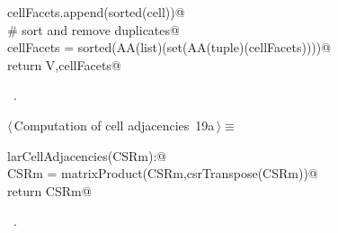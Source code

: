 \documentclass[11pt,oneside]{article}    %
\begin{document}
\begin{flushleft}
\begin{list}{}{}
\mbox{}\verb@                cellFacets.append(sorted(cell))@\\
\mbox{}\verb@    # sort and remove duplicates@\\
\mbox{}\verb@    cellFacets = sorted(AA(list)(set(AA(tuple)(cellFacets))))@\\
\mbox{}\verb@    return V,cellFacets@\\
\mbox{}\verb@@{\NWsep}
\end{list}
\vspace{-1ex}
\footnotesize\addtolength{\baselineskip}{-1ex}
\begin{list}{}{\setlength{\itemsep}{-\parsep}\setlength{\itemindent}{-\leftmargin}}
\item \NWtxtMacroRefIn\ .
\end{list}
\end{flushleft}



\begin{flushleft} \small \label{scrap29}
\protect{}$\langle\,$Computation of cell adjacencies\nobreak\ {\footnotesize 19a}$\,\rangle\equiv$
\vspace{-1ex}
\begin{list}{}{} \item
\mbox{}\verb@def larCellAdjacencies(CSRm):@\\
\mbox{}\verb@    CSRm = matrixProduct(CSRm,csrTranspose(CSRm))@\\
\mbox{}\verb@    return CSRm@\\
\mbox{}\verb@@{\NWsep}
\end{list}
\vspace{-1ex}
\footnotesize\addtolength{\baselineskip}{-1ex}
\begin{list}{}{\setlength{\itemsep}{-\parsep}\setlength{\itemindent}{-\leftmargin}}
\item \NWtxtMacroRefIn\ .
\end{list}
\end{flushleft}
\end{document}
